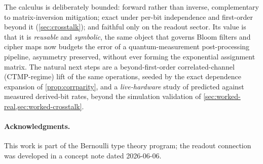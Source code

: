 \documentclass[12pt]{article}
\numberwithin{equation}{section}
\theoremstyle{plain}
\theoremstyle{definition}
\theoremstyle{remark}
\begin{document}
The calculus is deliberately bounded: forward rather than inverse,
complementary to matrix-inversion mitigation; exact under per-bit independence
and first-order beyond it (\cref{sec:crosstalk}); and faithful only on the
readout sector. Its value is that it is \emph{reusable} and \emph{symbolic}, the same
object that governs Bloom filters and cipher maps now budgets the error of a
quantum-measurement post-processing pipeline, asymmetry preserved, without ever
forming the exponential assignment matrix. The natural next steps are a
beyond-first-order correlated-channel (CTMP-regime) lift of the same
operations, seeded by the exact dependence expansion of \cref{prop:corrparity},
and a \emph{live-hardware} study of predicted against measured derived-bit
rates, beyond the simulation validation of
\cref{sec:worked-real,sec:worked-crosstalk}.

\paragraph{Acknowledgments.} This work is part of the Bernoulli type theory
program; the readout connection was developed in a concept note dated 2026-06-06.


\end{document}
